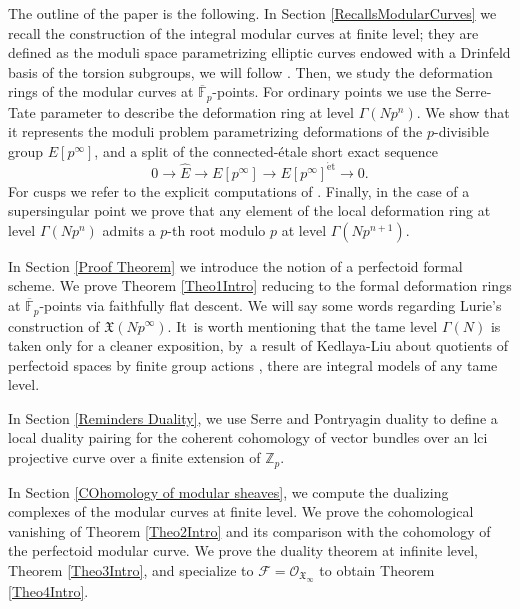 \documentclass[JEP,XML,SOM,Unicode,published]{cedram}
\newcommand{\et}{\mathrm{\acute{e}t}}
\numberwithin{equation}{section}
\theoremstyle{definition}
\newcommand{\bb}[1]{\mathbb{#1}}
\newcommand{\n}[1]{\mathcal{#1}}
\newcommand{\f}[1]{\mathfrak{#1}}
\newcommand{\s}[1]{\mathscr{#1}}
\begin{document}
The outline of the paper is the following. In Section \ref{RecallsModularCurves} we recall the construction of the integral modular curves at finite level; they are defined as the moduli space parametrizing elliptic curves endowed with a Drinfeld basis of the torsion subgroups, we will follow \cite{katz1985arithmetic}. Then, we study the deformation rings of the modular curves at $\overline{\bb{F}}_p$-points. For ordinary points we use the Serre-Tate parameter to describe the deformation ring at level $\Gamma(Np^n)$. We show that it represents the moduli problem parametrizing deformations of the $p$-divisible group $E[p^\infty]$, and a split of the connected-étale short exact sequence
\[
0\to \widehat{E} \to E[p^\infty] \to E[p^\infty]^{\et}\to 0.
\]
For cusps we refer to the explicit computations of \cite[\S\S 8 \& 10]{katz1985arithmetic}. Finally, in the case of a supersingular point we prove that any element of the local deformation ring at level $\Gamma(Np^n)$ admits a $p$-th root modulo $p$ at level $\Gamma(Np^{n+1})$.

In Section \ref{Proof Theorem} we introduce the notion of a perfectoid formal scheme. We prove Theorem \ref{Theo1Intro} reducing to the formal deformation rings at $\overline{\bb{F}}_p$-points via faithfully flat descent. We will say some words regarding Lurie's construction of $\f{X}(Np^\infty)$. It~is worth mentioning that the tame level $\Gamma(N)$ is taken only for a cleaner exposition, by~a result of Kedlaya-Liu about quotients of perfectoid spaces by finite group actions \cite[Th.\,3.3.26]{kedlaya2016relative}, there are integral models of any tame level.

In Section \ref{Reminders Duality}, we use Serre and Pontryagin duality to define a local duality pairing for the coherent cohomology of vector bundles over an lci projective curve over a finite extension of $\bb{Z}_p$.

In Section \ref{COhomology of modular sheaves}, we compute the dualizing complexes of the modular curves at finite level. We prove the cohomological vanishing of Theorem \ref{Theo2Intro} and its comparison with the cohomology of the perfectoid modular curve. We prove the duality theorem at infinite level, Theorem \ref{Theo3Intro}, and specialize to $\n{F}=\s{O}_{\f{X}_{\infty}}$ to obtain Theorem \ref{Theo4Intro}.
\end{document}
